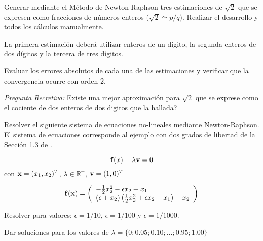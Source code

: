 \bigskip
\begin{exercise}
	
	Generar mediante el Método de Newton-Raphson tres estimaciones de $\sqrt{2}$ que se expresen como fracciones de números enteros ($\sqrt{2}\simeq p/q$). Realizar el desarrollo y todos los cálculos manualmente.
	
	La primera estimación deberá utilizar enteros de un dígito, la segunda enteros de dos dígitos y la tercera de tres dígitos.
	
	Evaluar los errores absolutos de cada una de las estimaciones y verificar que la convergencia ocurre con orden 2.
	
	\smallskip
	
	\textit{Pregunta Recretiva:} \textquestiondown Existe una mejor aproximación para $\sqrt{2}$ que se exprese como el cociente de dos enteros de dos digitos que la hallada? 
	\bigskip
\end{exercise}



\begin{exercise}
	
	Resolver el siguiente sistema de ecuaciones no-lineales mediante Newton-Raphson. El sistema de ecuaciones corresponde al ejemplo con dos grados de libertad de la Sección 1.3 de \citep{crisfield1996non}.
	
	$$
	{\bf f}(x)-\lambda {\bf v} = 0
	$$
	con ${\bf x}=(x_1,x_2)^T$, $\lambda \in \mathbb{R}^+$, ${\bf v}=(1,0)^T$
	
	$${\bf f}({\bf x})= \left(\begin{array}{l}
		- \frac{1}{2} x_2^2 - \epsilon x_2 + x_1 \\
		(\epsilon+x_2)\left(\frac{1}{2}x_2^2+\epsilon x_2 -x_1\right)+x_2 
	\end{array}\right)$$
	
	\bigskip
	
	Resolver para valores: $\epsilon=1/10$, $\epsilon=1/100$ y $\epsilon=1/1000$. 
	
	Dar soluciones para los valores de $\lambda=\{0;0.05;0.10;...;0.95;1.00\}$
	
\end{exercise}



